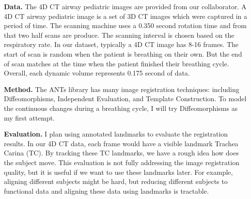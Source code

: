 \documentclass{article}
\begin{document}
{\bf Data.} 
The 4D CT airway pediatric images are provided from our collaborator.
A 4D CT airway pediatric image is a set of 3D CT images which were captured in a period of time.
The scanning machine uses a 0.350 second rotation time and from that two half scans are produce.
The scanning interval is chosen based on the respiratory rate.
In our dataset, typically a 4D CT image has 8-16 frames.
The start of scan is random when the patient is breathing on their own.
But the end of scan matches at the time when the patient finished their breathing cycle.
Overall, each dynamic volume represents 0.175 second of data.

{\bf Method.}
The ANTs library has many image registration techniques: including Diffeomorphisms, Independent Evaluation, and Template Construction.
To model the continuous changes during a breathing cycle, I will try Diffeomorphisms as my first attempt.


{\bf Evaluation.}
I plan using annotated landmarks to evaluate the registration results.
In our 4D CT data, each frame would have a visible landmark Trachea Carina (TC).
By tracking these TC landmarks, we have a rough idea how does the subject move.
This evaluation is not fully addressing the image registration quality, but it is useful if we want to use these landmarks later.
For example, aligning different subjects might be hard, but reducing different subjects to functional data and aligning these data using landmarks is tractable.



\end{document}

